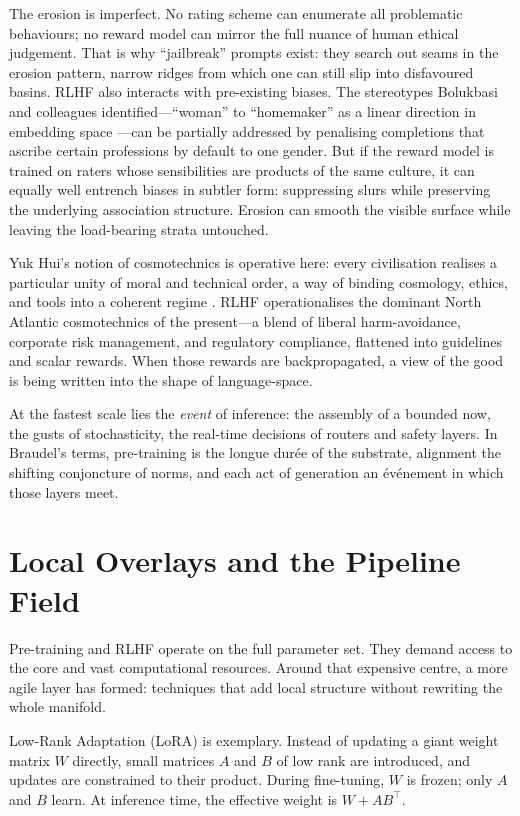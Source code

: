 \documentclass[12pt,a4paper]{article}
\begin{document}
The erosion is imperfect. No rating scheme can enumerate all problematic behaviours; no reward model can mirror the full nuance of human ethical judgement. That is why ``jailbreak'' prompts exist: they search out seams in the erosion pattern, narrow ridges from which one can still slip into disfavoured basins. RLHF also interacts with pre-existing biases. The stereotypes Bolukbasi and colleagues identified---``woman'' to ``homemaker'' as a linear direction in embedding space \cite{bolukbasi2016man}---can be partially addressed by penalising completions that ascribe certain professions by default to one gender. But if the reward model is trained on raters whose sensibilities are products of the same culture, it can equally well entrench biases in subtler form: suppressing slurs while preserving the underlying association structure. Erosion can smooth the visible surface while leaving the load-bearing strata untouched.

Yuk Hui's notion of cosmotechnics is operative here: every civilisation realises a particular unity of moral and technical order, a way of binding cosmology, ethics, and tools into a coherent regime \cite{hui2016question,hui2020cosmotechnics}. RLHF operationalises the dominant North Atlantic cosmotechnics of the present---a blend of liberal harm-avoidance, corporate risk management, and regulatory compliance, flattened into guidelines and scalar rewards. When those rewards are backpropagated, a view of the good is being written into the shape of language-space.

At the fastest scale lies the \emph{event} of inference: the assembly of a bounded now, the gusts of stochasticity, the real-time decisions of routers and safety layers. In Braudel's terms, pre-training is the longue dur\'ee of the substrate, alignment the shifting conjoncture of norms, and each act of generation an \'ev\'enement in which those layers meet.

\section{Local Overlays and the Pipeline Field}

Pre-training and RLHF operate on the full parameter set. They demand access to the core and vast computational resources. Around that expensive centre, a more agile layer has formed: techniques that add local structure without rewriting the whole manifold.

Low-Rank Adaptation (LoRA) is exemplary. Instead of updating a giant weight matrix $W$ directly, small matrices $A$ and $B$ of low rank are introduced, and updates are constrained to their product. During fine-tuning, $W$ is frozen; only $A$ and $B$ learn. At inference time, the effective weight is $W + AB^\top$.
\end{document}
